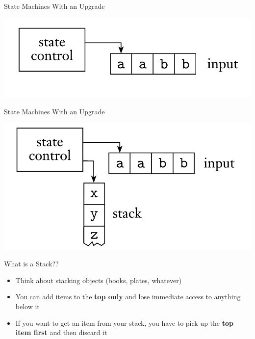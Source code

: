 \documentclass[aspectratio=169]{beamer}
\begin{document}
\begin{frame}{State Machines With an Upgrade}
    \begin{center}
        \includegraphics[scale=0.33]{images/finite_automata.png}
    \end{center}
\end{frame}

\begin{frame}{State Machines With an Upgrade}
    \begin{center}
        \includegraphics[scale=0.33]{images/pushdown_automata.png}
    \end{center}
\end{frame}

\begin{frame}{What is a Stack??}
    \begin{itemize}
        \item Think about stacking objects (books, plates, whatever) \pause
        \item You can add items to the \textbf{top only} and lose immediate access to anything below it \pause
        \item If you want to get an item from your stack, you have to pick up the \textbf{top item first} and then discard it
    \end{itemize}
\end{frame}
\end{document}
